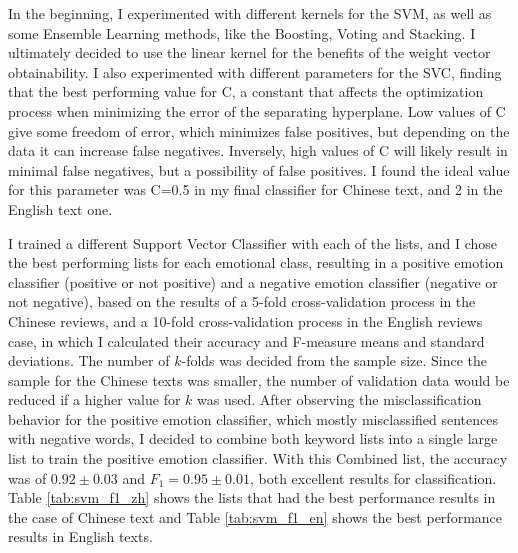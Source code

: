 \documentclass[review]{elsarticle}
\begin{document}
In the beginning, I experimented with different kernels for the SVM, as well as some Ensemble Learning methods, like the Boosting, Voting and Stacking. I ultimately decided to use the linear kernel for the benefits of the weight vector obtainability. I also experimented with different parameters for the SVC, finding that the best performing value for C, a constant that affects the optimization process when minimizing the error of the separating hyperplane. Low values of C give some freedom of error, which minimizes false positives, but depending on the data it can increase false negatives. Inversely, high values of C will likely result in minimal false negatives, but a possibility of false positives. I found the ideal value for this parameter was C=0.5 in my final classifier for Chinese text, and 2 in the English text one.

I trained a different Support Vector Classifier with each of the lists, and I chose the best performing lists for each emotional class, resulting in a positive emotion classifier (positive or not positive) and a negative emotion classifier (negative or not negative), based on the results of a 5-fold cross-validation process in the Chinese reviews, and a 10-fold cross-validation process in the English reviews case, in which I calculated their accuracy and F-measure means and standard deviations. The number of \(k\)-folds was decided from the sample size. Since the sample for the Chinese texts was smaller, the number of validation data would be reduced if a higher value for \(k\) was used. After observing the misclassification behavior for the positive emotion classifier, which mostly misclassified sentences with negative words, I decided to combine both keyword lists into a single large list to train the positive emotion classifier. With this Combined list, the accuracy was of \(0.92 \pm 0.03\) and \(F_1 = 0.95 \pm 0.01\), both excellent results for classification. Table \ref{tab:svm_f1_zh} shows the lists that had the best performance results in the case of Chinese text and Table \ref{tab:svm_f1_en} shows the best performance results in English texts.
\end{document}
